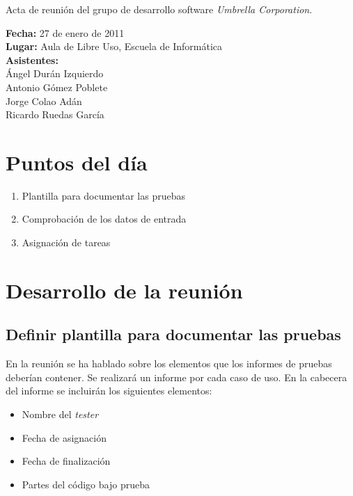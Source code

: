 \documentclass[a4paper,11pt,oneside]{article}
\begin{document}
\pagestyle{fancy}


\begin{center}
{\Large
Acta de reunión del grupo de desarrollo software \textit{Umbrella
Corporation}.}
\end{center}
\textbf{Fecha:} 27 de enero de 2011\\
\textbf{Lugar:} Aula de Libre Uso, Escuela de Informática\\
\textbf{Asistentes:}\\
\hspace*{1cm}Ángel Durán Izquierdo\\
\hspace*{1cm}Antonio Gómez Poblete\\
\hspace*{1cm}Jorge Colao Adán\\
\hspace*{1cm}Ricardo Ruedas García


\section*{Puntos del día}

\begin{enumerate}
\item Plantilla para documentar las pruebas
\item Comprobación de los datos de entrada
\item Asignación de tareas
\end{enumerate}


\section*{Desarrollo de la reunión}

\subsection*{Definir plantilla para documentar las pruebas}

En la reunión se ha hablado sobre los elementos que los informes de pruebas
deberían contener. Se realizará un informe por cada caso de uso. En la cabecera
del informe se incluirán los siguientes elementos:

\begin{itemize}
\item Nombre del \textit{tester}
\item Fecha de asignación
\item Fecha de finalización
\item Partes del código bajo prueba
\end{itemize}
\end{document}
